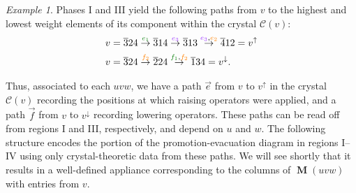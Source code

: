 \documentclass{amsart}
\theoremstyle{definition}
\theoremstyle{remark}
\newtheorem{example}[theorem]{Example}
\numberwithin{equation}{section}
\DeclareMathOperator{\PM}{\mathbf{M}}
\newcommand{\too}[1]{\stackrel{#1}{\to}}
\begin{document}
\begin{example}

\noindent Phases I and III yield the following paths from $v$ to the highest and lowest weight elements of its component within the crystal $\mathcal{C}(v)$:
\begin{align*}
  v &= \overline{3}24 \too{\eone} \overline{3}14 \too{\ethree} \overline{3}13 \too{\ethree,\etwo} \overline{4}12 = v^\uparrow \\
  v &= \overline{3}24 \too{\ftwo} \overline{2}24 \too{\fone,\ftwo} \overline{1}34 = v^\downarrow.
\end{align*}
\end{example}

Thus, associated to each $uvw$, we have a path $\vec{e}$ from $v$ to $v^\uparrow$ in the crystal $\mathcal{C}(v)$ recording the positions at which raising operators were applied, and a path $\vec{f}$ from $v$ to $v^\downarrow$ recording lowering operators. These paths can be read off from regions I and III, respectively, and depend on $u$ and $w$. The following structure encodes the portion of the promotion-evacuation diagram in regions I--IV using only crystal-theoretic data from these paths. We will see shortly that it results in a well-defined appliance corresponding to the columns of $\PM(uvw)$ with entries from $v$.
\end{document}
